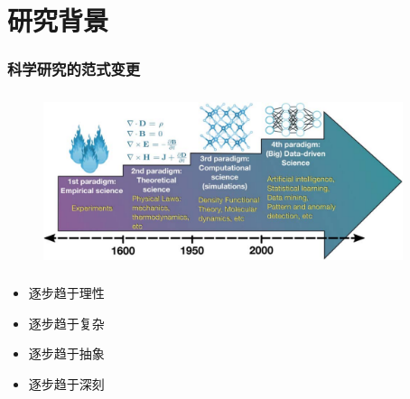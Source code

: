 \section{研究背景}
\frame
{
	\frametitle{科学研究的范式变更}
\begin{figure}[h!]
\vspace*{-0.28in}
\centering
\includegraphics[height=2.00in,width=4.15in]{Figures/Four_Model_3.png}
\label{Four_Model}
\end{figure}
\begin{minipage}[b]{0.48\textwidth}
 {\fontsize{7.5pt}{6.0pt}\selectfont\begin{itemize}%
	 \setlength{\itemsep}{10pt}
 \item 逐步趋于理性
 \item 逐步趋于复杂
 \end{itemize}}
\end{minipage}
\hfill
\begin{minipage}[b]{0.48\textwidth}
 {\fontsize{7.5pt}{6.0pt}\selectfont\begin{itemize}%
	 \setlength{\itemsep}{10pt}
 \item 逐步趋于抽象
 \item 逐步趋于深刻
 \end{itemize}}
\end{minipage}
}

